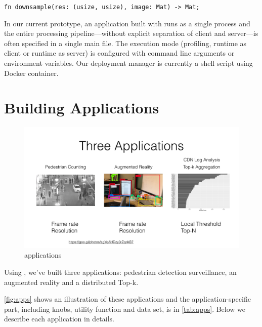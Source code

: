 \vspace{0.5em}
\texttt{fn downsample(res: (usize, usize), image: Mat) -> Mat;}
\vspace{0.5em}

In our current prototype, an application built with \sysname{} runs as a single
process and the entire processing pipeline---without explicit separation of
client and server---is often specified in a single main file. The execution mode
(profiling, runtime as client or runtime as server) is configured with command
line arguments or environment variables. Our deployment manager is currently a
shell script using Docker container.

\section{Building \sysname{} Applications}
\label{sec:build-appl}

\begin{figure}
  \centering
  \includegraphics[width=\textwidth]{figures/apps.pdf}
  \caption{\sysname{} applications}
  \label{fig:apps}
\end{figure}

Using \sysname{}, we've built three applications: pedestrian detection
surveillance, an augmented reality and a distributed Top-k.

\autoref{fig:apps} shows an illustration of these applications and the
application-specific part, including knobs, utility function and data set, is in
\autoref{tab:apps}. Below we describe each application in details.

